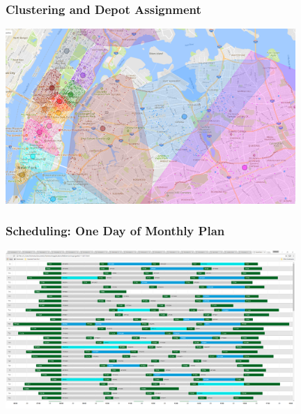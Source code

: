 \begin{frame}
\frametitle{Clustering and Depot Assignment}
\includegraphics[width=11cm]{imagesfieldservice/depotassignment}
\end{frame}





\begin{frame}
\frametitle{Scheduling: One Day of Monthly Plan}
\includegraphics[width=11cm]{imagesfieldservice/schedule}
\end{frame}

